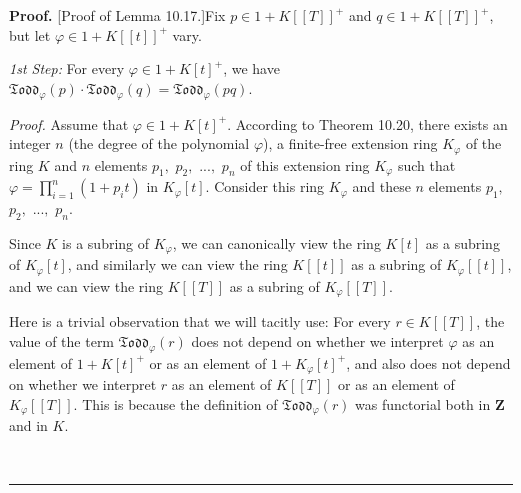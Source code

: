 \documentclass[numbers=enddot,12pt,final,onecolumn,notitlepage]{scrartcl}%
\newenvironment{proof}[1][Proof]{\noindent\textbf{#1.} }{\ \rule{0.5em}{0.5em}}
\begin{document}
\begin{proof}
[Proof of Lemma 10.17.]Fix $p\in1+K\left[  \left[  T\right]  \right]  ^{+}$
and $q\in1+K\left[  \left[  T\right]  \right]  ^{+}$, but let $\varphi
\in1+K\left[  \left[  t\right]  \right]  ^{+}$ vary.

\textit{1st Step:} For every $\varphi\in1+K\left[  t\right]  ^{+}$, we have
$\mathfrak{Todd}_{\varphi}\left(  p\right)  \cdot\mathfrak{Todd}_{\varphi
}\left(  q\right)  =\mathfrak{Todd}_{\varphi}\left(  pq\right)  $.

\textit{Proof.} Assume that $\varphi\in1+K\left[  t\right]  ^{+}$. According
to Theorem 10.20, there exists an integer $n$ (the degree of the polynomial
$\varphi$), a finite-free extension ring $K_{\varphi}$ of the ring $K$ and $n$
elements $p_{1},$ $p_{2},$ $...,$ $p_{n}$ of this extension ring $K_{\varphi}$
such that $\varphi=\prod\limits_{i=1}^{n}\left(  1+p_{i}t\right)  $ in
$K_{\varphi}\left[  t\right]  $. Consider this ring $K_{\varphi}$ and these
$n$ elements $p_{1},$ $p_{2},$ $...,$ $p_{n}$.

Since $K$ is a subring of $K_{\varphi}$, we can canonically view the ring
$K\left[  t\right]  $ as a subring of $K_{\varphi}\left[  t\right]  $, and
similarly we can view the ring $K\left[  \left[  t\right]  \right]  $ as a
subring of $K_{\varphi}\left[  \left[  t\right]  \right]  $, and we can view
the ring $K\left[  \left[  T\right]  \right]  $ as a subring of $K_{\varphi
}\left[  \left[  T\right]  \right]  $.

Here is a trivial observation that we will tacitly use: For every $r\in
K\left[  \left[  T\right]  \right]  $, the value of the term $\mathfrak{Todd}%
_{\varphi}\left(  r\right)  $ does not depend on whether we interpret
$\varphi$ as an element of $1+K\left[  t\right]  ^{+}$ or as an element of
$1+K_{\varphi}\left[  t\right]  ^{+}$, and also does not depend on whether we
interpret $r$ as an element of $K\left[  \left[  T\right]  \right]  $ or as an
element of $K_{\varphi}\left[  \left[  T\right]  \right]  $. This is because
the definition of $\mathfrak{Todd}_{\varphi}\left(  r\right)  $ was functorial
both in $\mathbf{Z}$ and in $K$.


\end{proof}
\end{document}
